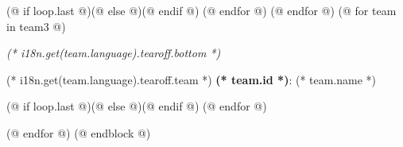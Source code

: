                 (@ if loop.last @)\newpage(@ else @)\vspace*{-1mm}(@ endif @)
            (@ endfor @)
        (@ endfor @)
        (@ for team in team3 @)%
            \setcounter{volume}{(* volume.number *)}%
            \setcounter{problem}{0}%
            \setcounter{team}{(* team.id *)}%

            \begin{minipage}[t][96mm][t]{\textwidth}%
                \begin{minipage}[t][88mm][t]{0.85\linewidth}%
                    \centering
                    \vspace*{37mm}
                    \LARGE
                    \textit{(* i18n.get(team.language).tearoff.bottom *)}
                \end{minipage}%
                \begin{minipage}[t][88mm][t]{0.15\linewidth}
                    \vspace{0mm}%
                    \hspace{4mm}%
                    \hspace{2pt}
                \end{minipage}
                {\small (* i18n.get(team.language).tearoff.team *) \textbf{(* team.id *)}: (* team.name *)}
            \end{minipage}%
            (@ if loop.last @)\newpage(@ else @)\vspace*{-1mm}(@ endif @)
        (@ endfor @)

    (@ endfor @)
(@ endblock @)
